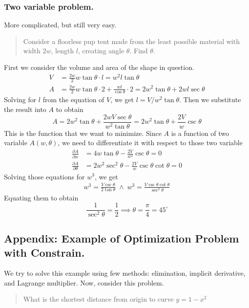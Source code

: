 \documentclass[../main.tex]{subfiles}
\begin{document}
\subsubsection*{Two variable problem.} More complicated, but still very easy.
\begin{quotation}
    Consider a floorless pup tent made from the least possible material with width $2w$, length $l$, creating angle $\theta$. Find $\theta$.
\end{quotation}

First we consider the volume and area of the shape in question.
\begin{align*}
    V&=\frac{2w}{2}w\tan \theta\cdot l=w^2l\tan\theta\\
    A&=\frac{2w}{2}w\tan \theta\cdot 2+\frac{wl}{\cos \theta}\cdot 2= 2w^2\tan\theta+2wl\sec \theta
\end{align*}
Solving for $l$ from the equation of $V$, we get $l=V/w^2\tan \theta$. Then we substitute the result into $A$ to obtain
\begin{equation*}
    A=2w^2\tan\theta+\frac{2wV\sec \theta}{w^2\tan\theta}= 2w^2\tan\theta+\frac{2V}{w}\csc\theta
\end{equation*}
This is the function that we want to minimize. Since $A$ is a function of two variable $A(w,\theta)$, we need to differentiate it with respect to those two variable
\begin{align*}
    \frac{\partial A}{\partial w}&=4w\tan \theta-\frac{2V}{w^2}\csc \theta=0\\
    \frac{\partial A}{\partial \theta}&=2w^2\sec^2\theta-\frac{2V}{w}\csc\theta\cot\theta=0
\end{align*}
Solving those equations for $w^3$, we get
\begin{align*}
    w^3=\frac{V\csc\theta}{2\tan\theta}\;\land\; w^3=\frac{V\csc\theta\cot\theta}{\sec^2\theta}
\end{align*}
Equating them to obtain
\begin{equation*}
    \frac{1}{\sec^2\theta}=\frac{1}{2}\implies \theta=\frac{\pi}{4}=45^\circ 
\end{equation*}

\subsection*{Appendix: Example of Optimization Problem with Constrain.} 
We try to solve this example using few methods: elimination, implicit derivative, and Lagrange multiplier. Now, consider this problem.
\begin{quotation}
    What is the shortest distance from origin to curve $y=1-x^2$
\end{quotation} 
\end{document}
